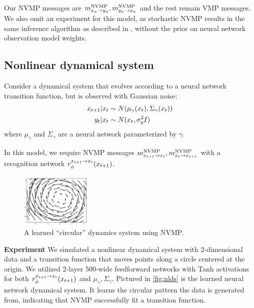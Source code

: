 Our NVMP messages are $m^{\text{NVMP}}_{x_n \rightarrow y_n}, m^{\text{NVMP}}_{y_n \rightarrow x_n}$
and the rest remain VMP messages. We also omit an experiment
for this model, as stochastic NVMP
results in the same inference algorithm as described in \citet{Johnson2016},
without the prior on neural network observation model weights.

\subsection{Nonlinear dynamical system}
Consider a dynamical system that evolves
according to a neural
network transition function, but is observed with Gaussian noise:
\begin{align*}
    x_{t + 1} | x_t &\sim N(\mu_\gamma(x_t), \Sigma_\gamma(x_t)) \\
    y_t | x_t &\sim N(x_t, \sigma^2_yI)
\end{align*}
where $\mu_\gamma$ and $\Sigma_\gamma$ are a neural network parameterized by $\gamma$.

In this model, we require NVMP messages $m^{\text{NVMP}}_{x_{t + 1} \rightarrow x_t}, m^{\text{NVMP}}_{x_t \rightarrow x_{t + 1}}$ with a recognition network $r^{x_{t + 1} \rightarrow x_t}_\phi(x_{t + 1})$.

\begin{figure}
    \centering
    \includegraphics[width=0.3\textwidth]{img/nvmp/nlds}
    \caption{A learned ``circular'' dynamics system using NVMP.}
    \label{fig:nlds}
\end{figure}

\textbf{Experiment} We simulated a nonlinear dynamical system
with 2-dimensional data and a transition function
that moves points along a circle centered at the origin.
We utilized 2-layer 500-wide feedforward networks with Tanh activations
for both $r^{x_{t + 1} \rightarrow x_t}_\phi(x_{t + 1})$ and $\mu_\gamma, \Sigma_\gamma$.
Pictured in \autoref{fig:nlds} is the learned neural network dynamical system.
It learns the circular pattern the data is generated from, indicating
that NVMP successfully fit a transition function.

